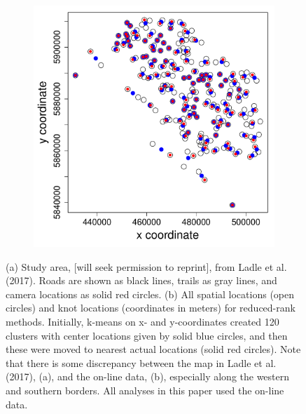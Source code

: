 \documentclass[11pt, titlepage]{article}\usepackage[]{graphicx}\usepackage[]{color}
\begin{document}
\begin{spacing}{1.9}
\begin{flushleft}
\begin{singlespace}
\begin{figure}
\begin{subfigure}[b]{0.5\textwidth}
	    \includegraphics[width=\linewidth]{figure/Fig-knotLocs-1.pdf}
      \caption{}
      \end{subfigure}
	  \caption{(a) Study area, [will seek permission to reprint], from Ladle et al. (2017). Roads are shown as black lines, trails as gray lines, and camera locations as solid red circles. (b) All spatial locations (open circles) and knot locations (coordinates in meters) for reduced-rank methods.  Initially, k-means on x- and y-coordinates created 120 clusters with center locations given by solid blue circles, and then these were moved to nearest actual locations (solid red circles).  Note that there is some discrepancy between the map in Ladle et al. (2017), (a), and the on-line data, (b), especially along the western and southern borders.  All analyses in this paper used the on-line data.}\label{fig:reduRank}
  \end{figure}




\end{singlespace}
\end{flushleft}
\end{spacing}
\end{document}
